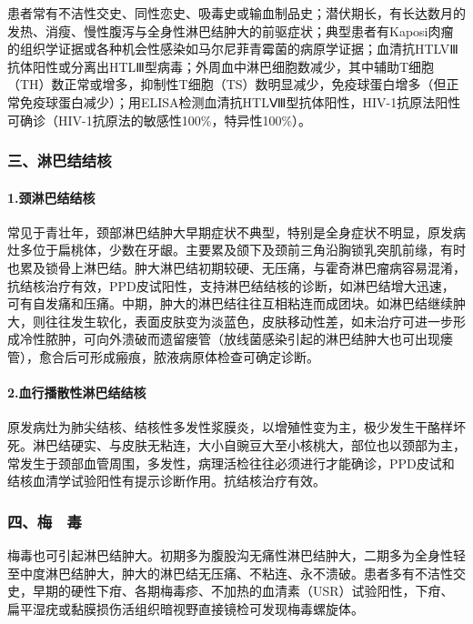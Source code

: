 患者常有不洁性交史、同性恋史、吸毒史或输血制品史；潜伏期长，有长达数月的发热、消瘦、慢性腹泻与全身性淋巴结肿大的前驱症状；典型患者有Kaposi肉瘤的组织学证据或各种机会性感染如马尔尼菲青霉菌的病原学证据；血清抗HTLVⅢ抗体阳性或分离出HTLⅢ型病毒；外周血中淋巴细胞数减少，其中辅助T细胞（TH）数正常或增多，抑制性T细胞（TS）数明显减少，免疫球蛋白增多（但正常免疫球蛋白减少）；用ELISA检测血清抗HTLⅧ型抗体阳性，HIV-1抗原法阳性可确诊（HIV-1抗原法的敏感性100\%，特异性100\%）。

\subsubsection{三、淋巴结结核}

\paragraph{1.颈淋巴结结核}

常见于青壮年，颈部淋巴结肿大早期症状不典型，特别是全身症状不明显，原发病灶多位于扁桃体，少数在牙龈。主要累及颌下及颈前三角沿胸锁乳突肌前缘，有时也累及锁骨上淋巴结。肿大淋巴结初期较硬、无压痛，与霍奇淋巴瘤病容易混淆，抗结核治疗有效，PPD皮试阳性，支持淋巴结结核的诊断，如淋巴结增大迅速，可有自发痛和压痛。中期，肿大的淋巴结往往互相粘连而成团块。如淋巴结继续肿大，则往往发生软化，表面皮肤变为淡蓝色，皮肤移动性差，如未治疗可进一步形成冷性脓肿，可向外溃破而遗留瘘管（放线菌感染引起的淋巴结肿大也可出现瘘管），愈合后可形成瘢痕，脓液病原体检查可确定诊断。

\paragraph{2.血行播散性淋巴结结核}

原发病灶为肺尖结核、结核性多发性浆膜炎，以增殖性变为主，极少发生干酪样坏死。淋巴结硬实、与皮肤无粘连，大小自豌豆大至小核桃大，部位也以颈部为主，常发生于颈部血管周围，多发性，病理活检往往必须进行才能确诊，PPD皮试和结核血清学试验阳性有提示诊断作用。抗结核治疗有效。

\subsubsection{四、梅　毒}

梅毒也可引起淋巴结肿大。初期多为腹股沟无痛性淋巴结肿大，二期多为全身性轻至中度淋巴结肿大，肿大的淋巴结无压痛、不粘连、永不溃破。患者多有不洁性交史，早期的硬性下疳、各期梅毒疹、不加热的血清素（USR）试验阳性，下疳、扁平湿疣或黏膜损伤活组织暗视野直接镜检可发现梅毒螺旋体。

